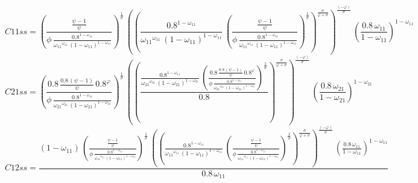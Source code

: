 \begin{dmath*}
C11ss = \left(\frac{\frac{{{\psi}}-1}{{{\psi}}}}{{{\phi}}\, \frac{0.8^{1-{{\omega_{11}}}}}{{{\omega_{11}}}^{{{\omega_{11}}}}\, \left(1-{{\omega_{11}}}\right)^{1-{{\omega_{11}}}}}}\right)^{\frac{1}{{{\sigma}}}}\, \left(\left(\frac{0.8^{1-{{\omega_{11}}}}}{{{\omega_{11}}}^{{{\omega_{11}}}}\, \left(1-{{\omega_{11}}}\right)^{1-{{\omega_{11}}}}}\, \left(\frac{\frac{{{\psi}}-1}{{{\psi}}}}{{{\phi}}\, \frac{0.8^{1-{{\omega_{11}}}}}{{{\omega_{11}}}^{{{\omega_{11}}}}\, \left(1-{{\omega_{11}}}\right)^{1-{{\omega_{11}}}}}}\right)^{\frac{1}{{{\sigma}}}}\right)^{\frac{{{\sigma}}}{{{\varphi}}+{{\sigma}}}}\right)^{\frac{\left(-{{\varphi}}\right)}{{{\sigma}}}}\, \left(\frac{0.8\, {{\omega_{11}}}}{1-{{\omega_{11}}}}\right)^{1-{{\omega_{11}}}}
\end{dmath*}
\begin{dmath*}
C21ss = \left(\frac{0.8\, \frac{0.8\, \left({{\psi}}-1\right)}{{{\psi}}}\, 0.8^{{{\varphi}}}}{{{\phi}}\, \frac{0.8^{1-{{\omega_{11}}}}}{{{\omega_{21}}}^{{{\omega_{21}}}}\, \left(1-{{\omega_{21}}}\right)^{1-{{\omega_{21}}}}}}\right)^{\frac{1}{{{\sigma}}}}\, \left(\left(\frac{\frac{0.8^{1-{{\omega_{11}}}}}{{{\omega_{21}}}^{{{\omega_{21}}}}\, \left(1-{{\omega_{21}}}\right)^{1-{{\omega_{21}}}}}\, \left(\frac{0.8\, \frac{0.8\, \left({{\psi}}-1\right)}{{{\psi}}}\, 0.8^{{{\varphi}}}}{{{\phi}}\, \frac{0.8^{1-{{\omega_{11}}}}}{{{\omega_{21}}}^{{{\omega_{21}}}}\, \left(1-{{\omega_{21}}}\right)^{1-{{\omega_{21}}}}}}\right)^{\frac{1}{{{\sigma}}}}}{0.8}\right)^{\frac{{{\sigma}}}{{{\varphi}}+{{\sigma}}}}\right)^{\frac{\left(-{{\varphi}}\right)}{{{\sigma}}}}\, \left(\frac{0.8\, {{\omega_{21}}}}{1-{{\omega_{21}}}}\right)^{1-{{\omega_{21}}}}
\end{dmath*}
\begin{dmath*}
C12ss = \frac{\left(1-{{\omega_{11}}}\right)\, \left(\frac{\frac{{{\psi}}-1}{{{\psi}}}}{{{\phi}}\, \frac{0.8^{1-{{\omega_{11}}}}}{{{\omega_{11}}}^{{{\omega_{11}}}}\, \left(1-{{\omega_{11}}}\right)^{1-{{\omega_{11}}}}}}\right)^{\frac{1}{{{\sigma}}}}\, \left(\left(\frac{0.8^{1-{{\omega_{11}}}}}{{{\omega_{11}}}^{{{\omega_{11}}}}\, \left(1-{{\omega_{11}}}\right)^{1-{{\omega_{11}}}}}\, \left(\frac{\frac{{{\psi}}-1}{{{\psi}}}}{{{\phi}}\, \frac{0.8^{1-{{\omega_{11}}}}}{{{\omega_{11}}}^{{{\omega_{11}}}}\, \left(1-{{\omega_{11}}}\right)^{1-{{\omega_{11}}}}}}\right)^{\frac{1}{{{\sigma}}}}\right)^{\frac{{{\sigma}}}{{{\varphi}}+{{\sigma}}}}\right)^{\frac{\left(-{{\varphi}}\right)}{{{\sigma}}}}\, \left(\frac{0.8\, {{\omega_{11}}}}{1-{{\omega_{11}}}}\right)^{1-{{\omega_{11}}}}}{0.8\, {{\omega_{11}}}}
\end{dmath*}
